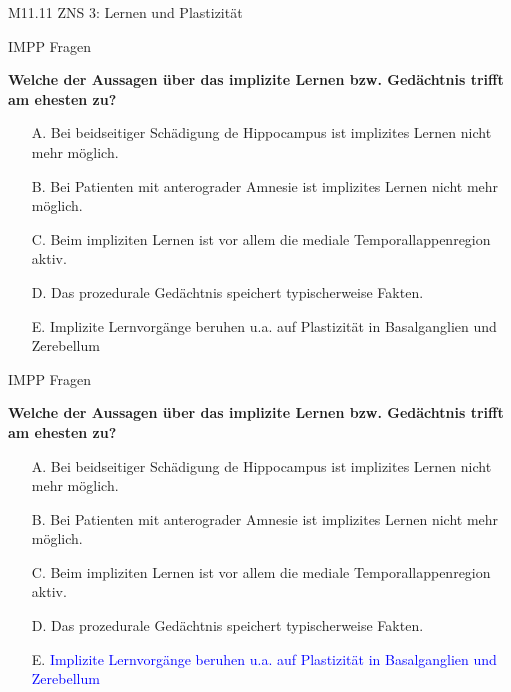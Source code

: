 \documentclass{beamer}
\begin{document}

\begin{frame}{M11.11 ZNS 3: Lernen und Plastizität} 

\end{frame}



\begin{frame}{IMPP Fragen}

\textbf{Welche der Aussagen über das implizite Lernen bzw. Gedächtnis trifft am ehesten zu?} \\[0.2 cm]

\begin{itemize}
\item[A.] Bei beidseitiger Schädigung de Hippocampus ist implizites Lernen nicht mehr möglich.
\item[B.] Bei Patienten mit anterograder Amnesie ist implizites Lernen nicht mehr möglich.
\item[C.] Beim impliziten Lernen ist vor allem die mediale Temporallappenregion aktiv.
\item[D.] Das prozedurale Gedächtnis speichert typischerweise Fakten.
\item[E.] Implizite Lernvorgänge beruhen u.a. auf Plastizität in Basalganglien und Zerebellum %

\end{itemize}

\end{frame}


\begin{frame}{IMPP Fragen}

\textbf{Welche der Aussagen über das implizite Lernen bzw. Gedächtnis trifft am ehesten zu?} \\[0.2 cm]

\begin{itemize}
\item[A.] Bei beidseitiger Schädigung de Hippocampus ist implizites Lernen nicht mehr möglich.
\item[B.] Bei Patienten mit anterograder Amnesie ist implizites Lernen nicht mehr möglich.
\item[C.] Beim impliziten Lernen ist vor allem die mediale Temporallappenregion aktiv.
\item[D.] Das prozedurale Gedächtnis speichert typischerweise Fakten.
\item[E.] \textcolor{blue}{Implizite Lernvorgänge beruhen u.a. auf Plastizität in Basalganglien und Zerebellum} %

\end{itemize}

\end{frame}
\end{document}
